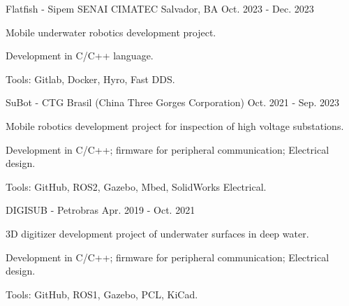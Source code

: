 

\begin{cventries}

\cventry
{Flatfish - Sipem} %
{SENAI CIMATEC} %
{Salvador, BA} %
{Oct. 2023 - Dec. 2023} %
{
  \begin{cvitems} %
    \item {Mobile underwater robotics development project.}
    \item {Development in C/C++ language.}
    \item {Tools: Gitlab, Docker, Hyro, Fast DDS.}
  \end{cvitems}
}

  \cventry
    {SuBot - CTG Brasil (China Three Gorges Corporation)} %
    {} %
    {} %
    {Oct. 2021 - Sep. 2023} %
    {
      \begin{cvitems} %
        \item {Mobile robotics development project for inspection of high voltage substations.}
        \item {Development in C/C++; firmware for peripheral communication; Electrical design.}
        \item {Tools: GitHub, ROS2, Gazebo, Mbed, SolidWorks Electrical.}
      \end{cvitems}
    }


  \cventry
    {DIGISUB - Petrobras} %
    {} %
    {} %
    {Apr. 2019 - Oct. 2021} %
    {
      \begin{cvitems} %
        \item {3D digitizer development project of underwater surfaces in deep water.}
        \item {Development in C/C++; firmware for peripheral communication; Electrical design.}
        \item {Tools: GitHub, ROS1, Gazebo, PCL, KiCad.}
      \end{cvitems}
    }



\end{cventries}
